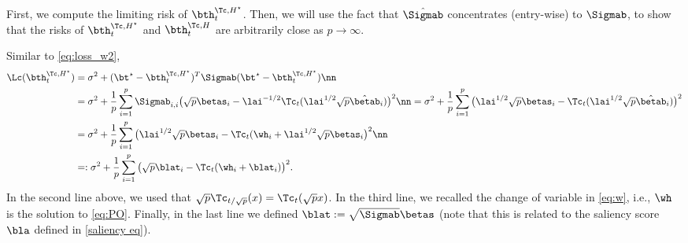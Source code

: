 First, we compute the limiting risk of $\bth^{\Tc,H^\star}_{t}$. Then, we will use the fact that $\hat\Sigmab$ concentrates (entry-wise) to $\Sigmab$, to show that the risks of $\bth^{\Tc,H^\star}_{t}$ and $\bth^{\Tc,H}_{t}$ are arbitrarily close as $p\rightarrow\infty$.

Similar to \eqref{eq:loss_w2}, 
\begin{align}
\Lc(\bth^{\Tc,H^\star}_t) &= \sigma^2 + (\bt^\star-\bth^{\Tc,H^\star}_t)^T\Sigmab(\bt^\star-\bth^{\Tc,H^\star}_t) \nn \\
  &= \sigma^2 + \frac{1}{p}\sum_{i=1}^p\Sigmab_{i,i}\big(\sqrt{p}\betas_i-\lai^{-1/2}\Tc_{t}(\lai^{1/2}\sqrt{p}\hat\betab_i)\big)^2 \nn
    = \sigma^2 + \frac{1}{p}\sum_{i=1}^p\big(\lai^{1/2}\sqrt{p}\betas_i-\Tc_{t}(\lai^{1/2}\sqrt{p}\hat\betab_i)\big)^2 
      \\
    &= \sigma^2 + \frac{1}{p}\sum_{i=1}^p\big(\lai^{1/2}\sqrt{p}\betas_i-\Tc_{t}(\wh_i + \lai^{1/2}\sqrt{p}\betas_i\big)^2 \nn \\
        &=: \sigma^2 + \frac{1}{p}\sum_{i=1}^p\big(\sqrt{p}\blat_i-\Tc_{t}(\wh_i + \blat_i)\big)^2.\label{eq:hesa}
\end{align}
In the second line above, we used that $\sqrt{p}\Tc_{t/\sqrt{p}}(x)=\Tc_{t}(\sqrt{p}x)$. In the third line, we recalled the change of variable in \eqref{eq:w}, i.e., $\wh$ is the solution to \eqref{eq:PO}. Finally, in the last line we defined $\blat:=\sqrt{\Sigmab}\betas$ (note that this is related to the saliency score $\bla$ defined in \eqref{saliency eq}).

